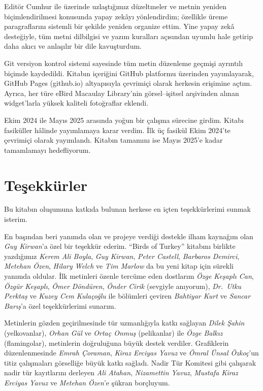 \documentclass[
  a4paper,
  DIV=11,
  numbers=noendperiod]{scrartcl}
\begin{document}
Editör Cumhur ile üzerinde uzlaştığımız düzeltmeler ve metnin yeniden
biçimlendirilmesi konusunda yapay zekâyı yönlendirdim; özellikle üreme
paragraflarını sistemli bir şekilde yeniden organize ettim. Yine yapay
zekâ desteğiyle, tüm metni dilbilgisi ve yazım kuralları açısından
uyumlu hale getirip daha akıcı ve anlaşılır bir dile kavuşturdum.

Git versiyon kontrol sistemi sayesinde tüm metin düzenleme geçmişi
ayrıntılı biçimde kaydedildi. Kitabın içeriğini GitHub platformu
üzerinden yayımlayarak, GitHub Pages (github.io) altyapısıyla çevrimiçi
olarak herkesin erişimine açtım. Ayrıca, her türe eBird Macaulay
Library'nin görsel--işitsel arşivinden alınan widget'larla yüksek
kaliteli fotoğraflar eklendi.

Ekim 2024 ile Mayıs 2025 arasında yoğun bir çalışma sürecine girdim.
Kitabı fasiküller hâlinde yayımlamaya karar verdim. İlk üç fasikül Ekim
2024'te çevrimiçi olarak yayımlandı. Kitabın tamamını ise Mayıs 2025'e
kadar tamamlamayı hedefliyorum.

\section*{Teşekkürler}\label{teux15fekkuxfcrler}


Bu kitabın oluşumuna katkıda bulunan herkese en içten teşekkürlerimi
sunmak isterim.

En başından beri yanımda olan ve projeye verdiği destekle ilham kaynağım
olan \emph{Guy Kirwan}'a özel bir teşekkür ederim. ``Birds of Turkey''
kitabını birlikte yazdığımız \emph{Kerem Ali Boyla}, \emph{Guy Kirwan},
\emph{Peter Castell}, \emph{Barbaros Demirci}, \emph{Metehan Özen},
\emph{Hilary Welch} ve \emph{Tim Marlow} da bu yeni kitap için sürekli
yanımda oldular. İlk metinleri özenle tercüme eden dostlarım \emph{Özge
Keşaplı Can}, \emph{Özgür Keşaplı}, \emph{Ömer Döndüren}, \emph{Önder
Cirik} (sevgiyle anıyorum), \emph{Dr.~Utku Perktaş} ve \emph{Kuzey Cem
Kulaçoğlu} ile bölümleri çeviren \emph{Bahtiyar Kurt} ve \emph{Sancar
Barış}'a özel teşekkürlerimi sunarım.

Metinlerin gözden geçirilmesinde tür uzmanlığıyla katkı sağlayan
\emph{Dilek Şahin} (yelkovanlar), \emph{Orhan Gül} ve \emph{Ortaç Onmuş}
(pelikanlar) ile \emph{Özge Balkız} (flamingolar), metinlerin
doğruluğuna büyük destek verdiler. Grafiklerin düzenlenmesinde
\emph{Emrah Çoraman}, \emph{Kiraz Erciyas Yavuz} ve \emph{Ömral Ünsal
Özkoç}'un titiz çalışmaları görselliğe büyük katkı sağladı. Nadir Tür
Komitesi gibi çalışarak nadir tür kayıtlarını derleyen \emph{Ali
Atahan}, \emph{Nizamettin Yavuz}, \emph{Mustafa Kiraz Erciyas Yavuz} ve
\emph{Metehan Özen}'e şükran borçluyum.
\end{document}
